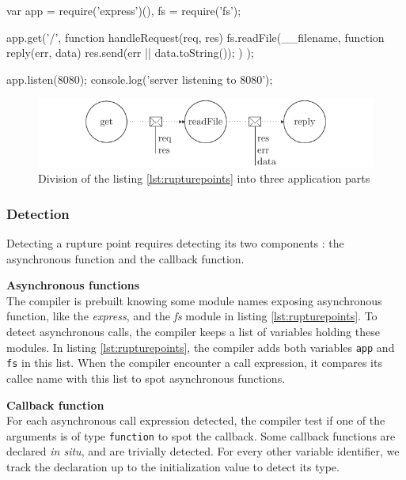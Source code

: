 \begin{code}[js, caption={Example of an application presenting the two types of rupture points : a \texttt{start} with the call to \texttt{app.get()}, and a \texttt{post} with the call to \texttt{fs.readFile()}},label={lst:rupturepoints}]
var app = require('express')(),
    fs = require('fs');

app.get('/', function handleRequest(req, res) {
  fs.readFile(__filename, function reply(err, data) {
    res.send(err || data.toString());
  })
});

app.listen(8080);
console.log('server listening to 8080');
\end{code}

\begin{figure}[h!]
\begin{center}
  \includegraphics[width=\linewidth]{ressources/flux-2.pdf}
  \caption{Division of the listing \ref{lst:rupturepoints} into three application parts}
  \label{fig:flux-2}
\end{center}
\end{figure}

\subsubsection{Detection}

Detecting a rupture point requires detecting its two components : the asynchronous function and the callback function.

\textbf{Asynchronous functions}\\
The compiler is prebuilt knowing some module names exposing asynchronous function, like the \textit{express}, and the \textit{fs} module in listing \ref{lst:rupturepoints}.
To detect asynchronous calls, the compiler keeps a list of variables holding these modules.
In listing \ref{lst:rupturepoints}, the compiler adds both variables \texttt{app} and \texttt{fs} in this list.
When the compiler encounter a call expression, it compares its callee name with this list to spot asynchronous functions.

\textbf{Callback function}\\
For each asynchronous call expression detected, the compiler test if one of the arguments is of type \texttt{function} to spot the callback.
Some callback functions are declared \textit{in situ}, and are trivially detected.
For every other variable identifier, we track the declaration up to the initialization value to detect its type.

